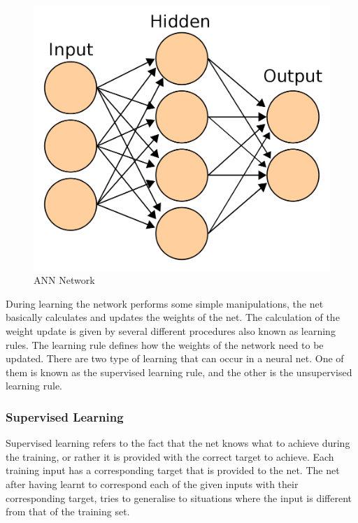 \documentclass[a4paper,12pt]{report}
\begin{document}
\begin{figure}[h!]
\centering
\includegraphics[width=\linewidth]{annnetwork.png} 
\caption{ANN Network\cite{fig1}}
\end{figure}



During learning the network performs some simple manipulations, the net basically calculates and updates the weights of the net. The calculation of the weight update is given by several different 
procedures also known as learning rules. The learning rule defines how the weights of the network need to be updated. There are two type of learning that can occur in a neural net.
One of them is known as the supervised learning rule, and the other is the unsupervised learning rule.

\subsubsection*{Supervised Learning}
Supervised learning refers to the fact that the net knows what to achieve during the training, or rather it is provided with the correct target to achieve.
Each training input has a corresponding target that is provided to the net. The net after having learnt to correspond each of the given inputs with their
corresponding target, tries to generalise to situations where the input is different from that of the training set.
\end{document}
